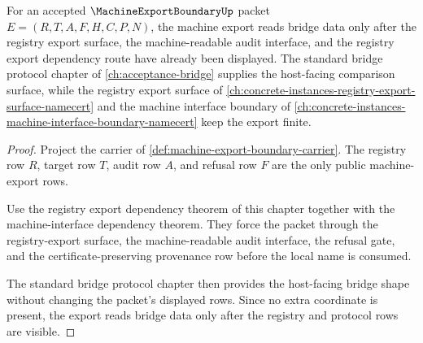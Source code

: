 \begin{theorem}
\label{thm:machine-export-boundary-standard-bridge-route}
For an accepted $\MachineExportBoundaryUp$ packet $E=(R,T,A,F,H,C,P,N)$, the machine export reads bridge data only after the registry export surface, the machine-readable audit interface, and the registry export dependency route have already been displayed. The standard bridge protocol chapter of \autoref{ch:acceptance-bridge} supplies the host-facing comparison surface, while the registry export surface of \autoref{ch:concrete-instances-registry-export-surface-namecert} and the machine interface boundary of \autoref{ch:concrete-instances-machine-interface-boundary-namecert} keep the export finite.
\end{theorem}
\begin{proof}
Project the carrier of \autoref{def:machine-export-boundary-carrier}. The registry row $R$, target row $T$, audit row $A$, and refusal row $F$ are the only public machine-export rows.

Use the registry export dependency theorem of this chapter together with the machine-interface dependency theorem. They force the packet through the registry-export surface, the machine-readable audit interface, the refusal gate, and the certificate-preserving provenance row before the local name is consumed.

The standard bridge protocol chapter then provides the host-facing bridge shape without changing the packet's displayed rows. Since no extra coordinate is present, the export reads bridge data only after the registry and protocol rows are visible.
\end{proof}
